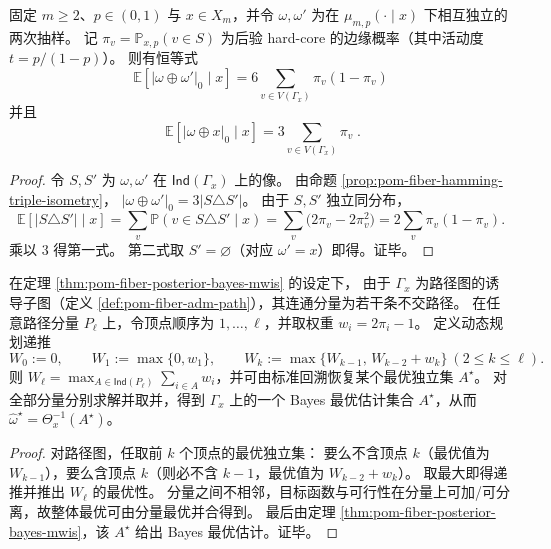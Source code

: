 \begin{corollary}[后验两次抽样的条件汉明多样性泛函]\label{cor:pom-fiber-posterior-hamming-diversity}
固定 \(m\ge 2\)、\(p\in(0,1)\) 与 \(x\in X_m\)，并令 \(\omega,\omega'\) 为在 \(\mu_{m,p}(\cdot\mid x)\) 下相互独立的两次抽样。
记 \(\pi_v=\mathbb P_{x,p}(v\in S)\) 为后验 hard-core 的边缘概率（其中活动度 \(t=p/(1-p)\)）。
则有恒等式
\[
\boxed{\;
\mathbb E\!\left[|\omega\oplus\omega'|_0\mid x\right]
=6\sum_{v\in V(\Gamma_x)}\pi_v(1-\pi_v)\;}
\]
并且
\[
\boxed{\;
\mathbb E\!\left[|\omega\oplus x|_0\mid x\right]
=3\sum_{v\in V(\Gamma_x)}\pi_v\; }.
\]
\end{corollary}
\begin{proof}
令 \(S,S'\) 为 \(\omega,\omega'\) 在 \(\mathsf{Ind}(\Gamma_x)\) 上的像。
由命题 \ref{prop:pom-fiber-hamming-triple-isometry}，
\(
|\omega\oplus\omega'|_0=3|S\triangle S'|
\)。
由于 \(S,S'\) 独立同分布，
\[
\mathbb E[|S\triangle S'|\mid x]
=\sum_v \mathbb P(v\in S\triangle S'\mid x)
=\sum_v \bigl(2\pi_v-2\pi_v^2\bigr)
=2\sum_v \pi_v(1-\pi_v).
\]
乘以 \(3\) 得第一式。
第二式取 \(S'=\varnothing\)（对应 \(\omega'=x\)）即得。证毕。
\end{proof}

\begin{corollary}\label{cor:pom-fiber-bayes-decoding-linear-scan}
在定理 \ref{thm:pom-fiber-posterior-bayes-mwis} 的设定下，
由于 \(\Gamma_x\) 为路径图的诱导子图（定义 \ref{def:pom-fiber-adm-path}），其连通分量为若干条不交路径。
在任意路径分量 \(P_\ell\) 上，令顶点顺序为 \(1,\dots,\ell\)，并取权重 \(w_i=2\pi_i-1\)。
定义动态规划递推
\[
W_0:=0,\qquad
W_1:=\max\{0,w_1\},\qquad
W_k:=\max\{W_{k-1},\,W_{k-2}+w_k\}\ (2\le k\le \ell).
\]
则 \(W_\ell=\max_{A\in\mathsf{Ind}(P_\ell)}\sum_{i\in A}w_i\)，并可由标准回溯恢复某个最优独立集 \(A^\star\)。
对全部分量分别求解并取并，得到 \(\Gamma_x\) 上的一个 Bayes 最优估计集合 \(A^\star\)，从而 \(\widehat\omega^\star=\Theta_x^{-1}(A^\star)\)。
\end{corollary}
\begin{proof}
对路径图，任取前 \(k\) 个顶点的最优独立集：
要么不含顶点 \(k\)（最优值为 \(W_{k-1}\)），要么含顶点 \(k\)（则必不含 \(k-1\)，最优值为 \(W_{k-2}+w_k\)）。
取最大即得递推并推出 \(W_\ell\) 的最优性。
分量之间不相邻，目标函数与可行性在分量上可加/可分离，故整体最优可由分量最优并合得到。
最后由定理 \ref{thm:pom-fiber-posterior-bayes-mwis}，该 \(A^\star\) 给出 Bayes 最优估计。证毕。
\end{proof}

